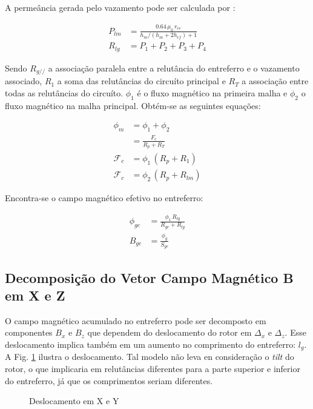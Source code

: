 A permeância gerada pelo vazamento pode ser calculada por \citep{Leupold1996a}: 

\begin{align}
P_{lm} &= \frac{0.64 \,  \mu_0 \,r_{ee}}{h_m/(h_m+2h_{ef})+1} \\
R_{lg} &= P_1 + P_2 + P_3 + P_4	
\end{align} 

Sendo $R_{g//}$ a associação paralela entre a relutância do entreferro e o vazamento associado, $R_1$ a soma das relutâncias do circuíto principal e $R_T$ a associação entre todas as relutâncias do circuíto. $\phi_1$ é o fluxo magnético na primeira malha e $\phi_2$ o fluxo magnético na malha principal. Obtém-se as seguintes equações:

\begin{align}
\phi_m &= \phi_1 + \phi_2 \\
&= \frac{F_c}{R_p + R_T} \\
\mathcal{F}_c	 &= \phi_1 \, (R_p + R_1) \\
\mathcal{F}_c    &= \phi_2 \, (R_p + R_{lm})
\end{align}

Encontra-se o campo magnético efetivo no entreferro:

\begin{align}
\phi_{ge} &= \frac{\phi_1 \, R_{lg}}{R_{ge}+R_{lg}} \\
B_{ge} &= \frac{\phi_g}{S_{ge}}
\end{align}


\subsection{Decomposição do Vetor Campo Magnético B em X e Z} \label{SubSec:CampoX/Y}

O campo magnético acumulado no entreferro pode ser decomposto em componentes $B_x$ e $B_z$ que dependem do deslocamento do rotor em $\Delta_x$ e $\Delta_z$. Esse deslocamento implica também em um aumento no comprimento do entreferro: $l_g$. A Fig. \ref{Fig:modelo:passivo:DxDz} ilustra o deslocamento. Tal modelo não leva en consideração o \textit{tilt} do rotor, o que implicaria em relutâncias diferentes para a parte superior e inferior do entreferro, já que os comprimentos seriam diferentes. 

\begin{figure}[!ht]
	\centering
	\def\svgwidth{0.6\columnwidth}
	
	\caption{Deslocamento em X e Y}
	\label{Fig:modelo:passivo:DxDz}
\end{figure}

